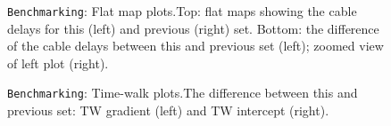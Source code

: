\documentclass[12pt]{article}
\begin{document}
\begin{figure}
\centering
\noindent{}
  \caption{\centering \texttt{Benchmarking}: Flat map plots.\hspace{\textwidth}Top: flat maps showing the cable delays for this (left) and previous (right) set. Bottom: the difference of the cable delays between this and previous set (left); zoomed view of left plot (right).}
  \label{fig:bench5}
\end{figure}

\begin{figure}
\centering
\noindent{}
  \caption{\centering \texttt{Benchmarking}: Time-walk plots.\hspace{\textwidth}The difference between this and previous set: TW gradient (left) and TW intercept (right).}
  \label{fig:bench6}
\end{figure}
\end{document}
